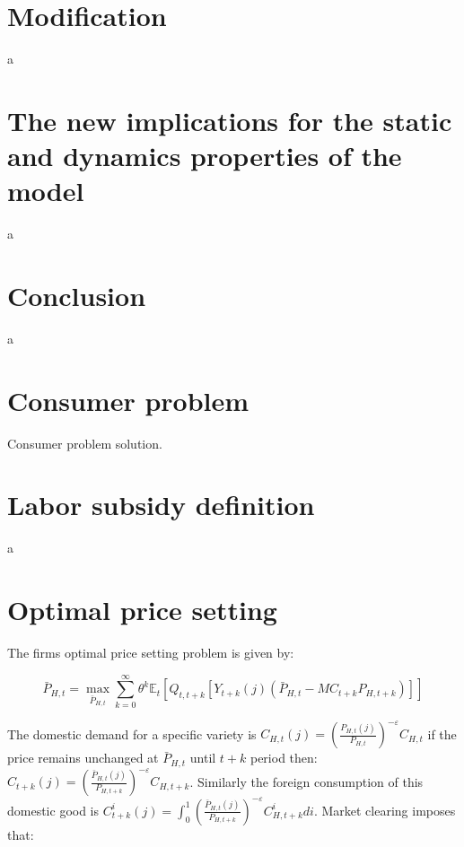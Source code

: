 \documentclass{article}
\newcommand{\Et}{\mathbb{E}_t}
\begin{document}
\begin{figure}[H]
\centering


\end{figure}

\section{Modification}
a

\section{The new implications for the static and dynamics properties of the model}
a


\section{Conclusion}
a



\appendix
\section{Consumer problem}
Consumer problem solution.

\section{Labor subsidy definition}
a

\section{Optimal price setting}
The firms optimal price setting problem is given by:

\begin{equation}
    \bar P_{H,t} = \max_{\bar P_{H,t}} \sum^\infty_{k=0} \theta^k \Et \left[ Q_{t, t+k}[Y_{t+k}(j) (\bar P_{H,t} - MC_{t+k} P_{H,t+k})] \right]
\end{equation}

The domestic demand for a specific variety is $C_{H,t}(j) = \left( \frac{P_{H,t}(j)}{P_{H,t}} \right)^{-\varepsilon} C_{H, t}$ if the price remains unchanged at $\bar P_{H,t}$ until $t+k$ period then: $C_{t+k}(j) = \left( \frac{\bar P_{H,t}(j)}{P_{H,t+k}}\right)^{-\varepsilon} C_{H, t+k}$. Similarly the foreign consumption of this domestic good is $C^i_{t+k}(j) = \int^1_0 \left( \frac{\bar P_{H,t}(j)}{P_{H,t+k}} \right)^{-\varepsilon} C^i_{H, t+k} di$. Market clearing imposes that:
\end{document}
